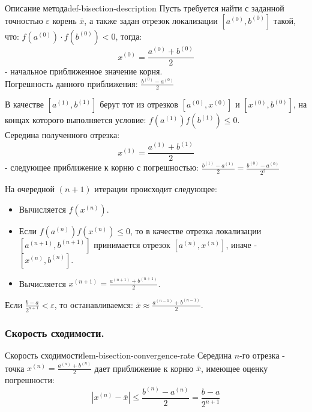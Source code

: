 \documentclass[14pt]{extarticle}
\begin{document}
        \begin{definition}{Описание метода}{def-bisection-description}
            Пусть требуется найти с заданной точностью $\varepsilon$ корень $\overline{x}$, а также задан отрезок локализации $[a^{(0)}, b^{(0)}]$ такой, что: $f(a^{(0)}) \cdot f(b^{(0)}) < 0$, тогда:
            $$x^{(0)} = \frac{a^{(0)} + b^{(0)}}{2}$$
            - начальное приближенное значение корня.\\
            Погрешность данного приближения: $\frac{b^{(0)} - a^{(0)}}{2}$

            \vspace{\baselineskip}

            В качестве $[a^{(1)}, b^{(1)}]$ берут тот из отрезков $[a^{(0)}, x^{(0)}]$ и $[x^{(0)}, b^{(0)}]$, на концах которого выполняется условие: $f(a^{(1)})f(b^{(1)}) \leq 0$.\\
            Середина полученного отрезка: 
            $$x^{(1)} = \frac{a^{(1)} + b^{(1)}}{2}$$ 
            - следующее приближение к корню с погрешностью: $\frac{b^{(1)} - a^{(1)}}{2} = \frac{b^{(0)} - a^{(0)}}{2^{2}}$

            \vspace{\baselineskip}

            На очередной $(n + 1)$ итерации происходит следующее:
            \begin{itemize}
                \item Вычисляется $f(x^{(n)})$.
                \item Если $f(a^{(n)})f(x^{(n)}) \leq 0$, то в качестве отрезка локализации $[a^{(n + 1)}, b^{(n + 1)}]$ принимается отрезок $[a^{(n)}, x^{(n)}]$, иначе - $[x^{(n)}, b^{(n)}]$.
                \item Вычисляется $x^{(n + 1)} = \frac{a^{(n + 1)} + b^{(n + 1)}}{2}$.
            \end{itemize}

            \vspace{\baselineskip}

            Если $\frac{b - a}{2^{n + 1}} < \varepsilon$, то останавливаемся: $\overline{x} \approx \frac{a^{(n - 1)} + b^{(n - 1)}}{2}$.
        \end{definition}

    \subsubsection{Скорость сходимости.}

        \begin{lemma}{Скорость сходимости}{lem-bisection-convergence-rate}
            Середина $n$-го отрезка - точка $x^{(n)} = \frac{a^{(n)} + b^{(n)}}{2}$ дает приближение к корню $\overline{x}$, имеющее оценку погрешности:
            $$|x^{(n)} - \overline{x}| \leq \frac{b^{(n)} - a^{(n)}}{2} = \frac{b-a}{2^{n + 1}}$$
        \end{lemma}
\end{document}
